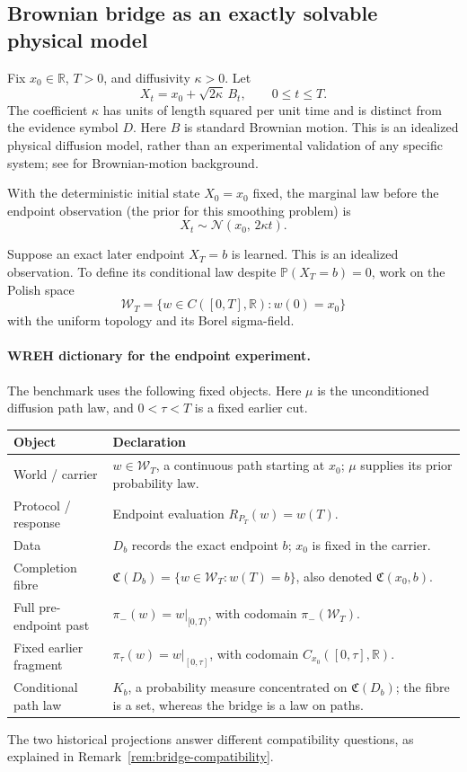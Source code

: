 \documentclass[11pt]{article}
\newcommand{\Wcal}{\mathcal W}
\newcommand{\Ccal}{\mathfrak C}
\begin{document}
\subsection{Brownian bridge as an exactly solvable physical model}

Fix $x_0\in\mathbb R$, $T>0$, and diffusivity $\kappa>0$. Let
\[
X_t=x_0+\sqrt{2\kappa}\,B_t,\qquad 0\le t\le T.
\]
The coefficient $\kappa$ has units of length squared per unit time
and is distinct from the evidence symbol $D$.
Here $B$ is standard Brownian motion. This is an idealized physical
diffusion model, rather than an experimental validation of any specific
system; see \cite{KaratzasShreve1998} for Brownian-motion background.

With the deterministic initial state $X_0=x_0$ fixed, the marginal
law before the endpoint observation (the prior for this smoothing
problem) is
\[
X_t\sim
\mathcal N(x_0,\,2\kappa t).
\]

Suppose an exact later endpoint $X_T=b$ is learned.
This is an idealized observation. To define its conditional law despite
$\mathbb P(X_T=b)=0$, work on the Polish space
\[
\Wcal_T=\{w\in C([0,T],\mathbb R):w(0)=x_0\}
\]
with the uniform topology and its Borel sigma-field.

\paragraph{WREH dictionary for the endpoint experiment.}
The benchmark uses the following fixed objects. Here $\mu$ is the
unconditioned diffusion path law, and $0<\tau<T$ is a fixed earlier cut.
\begin{center}
\begin{tabularx}{\linewidth}{@{}lX@{}}
\toprule
Object & Declaration \\
\midrule
World / carrier & $w\in\Wcal_T$, a continuous path starting at $x_0$;
  $\mu$ supplies its prior probability law. \\
Protocol / response & Endpoint evaluation $R_{P_T}(w)=w(T)$. \\
Data & $D_b$ records the exact endpoint $b$; $x_0$ is fixed in the carrier. \\
Completion fibre & $\Ccal(D_b)=\{w\in\Wcal_T:w(T)=b\}$,
  also denoted $\Ccal(x_0,b)$. \\
Full pre-endpoint past & $\pi_-(w)=w|_{[0,T)}$,
  with codomain $\pi_-(\Wcal_T)$. \\
Fixed earlier fragment & $\pi_\tau(w)=w|_{[0,\tau]}$,
  with codomain $C_{x_0}([0,\tau],\mathbb R)$. \\
Conditional path law & $K_b$, a probability measure concentrated on
  $\Ccal(D_b)$; the fibre is a set, whereas the bridge is a law on paths. \\
\bottomrule
\end{tabularx}
\end{center}
The two historical projections answer different compatibility questions,
as explained in Remark~\ref{rem:bridge-compatibility}.
\end{document}
